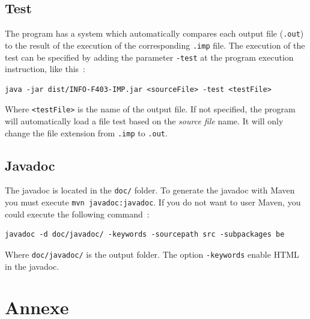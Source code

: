 \documentclass[a4paper,11pt]{article}
\begin{document}
  \subsection{Test}
    The program has a system which automatically compares each output file (\verb|.out|) to the result of the execution of the corresponding \verb|.imp| file. The execution of the test can be specified by adding the parameter \verb|-test| at the program execution instruction, like this~:
    \begin{verbatim}
java -jar dist/INFO-F403-IMP.jar <sourceFile> -test <testFile>\end{verbatim}
    Where \verb|<testFile>| is the name of the output file. If not specified, the program will automatically load a file test based on the \textit{source file} name. It will only change the file extension from \verb|.imp| to \verb|.out|.
    
    
  \subsection{Javadoc}
    The javadoc is located in the \verb|doc/| folder. To generate the javadoc with Maven you must execute \verb|mvn javadoc:javadoc|.  If you do not want to user Maven, you could execute the following command~:
    \begin{verbatim}
javadoc -d doc/javadoc/ -keywords -sourcepath src -subpackages be
    \end{verbatim}
    Where \verb|doc/javadoc/| is the output folder. The option \verb|-keywords| enable HTML in the javadoc.

\section{Annexe}
\end{document}

